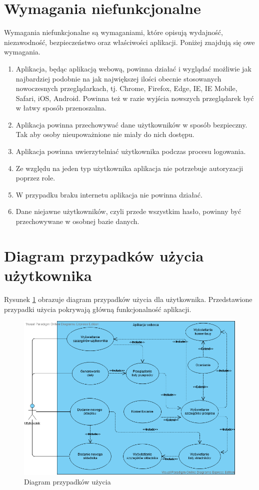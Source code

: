 \section{Wymagania niefunkcjonalne}
Wymagania niefunkcjonalne są wymaganiami, które opisują wydajność, niezawodność, bezpieczeństwo oraz właściwości aplikacji.\cite{analiza}
Poniżej znajdują się owe wymagania.
\begin{enumerate}
    \item Aplikacja, będąc aplikacją webową, powinna działać i wyglądać możliwie jak najbardziej podobnie na jak największej ilości obecnie stosowanych nowoczesnych przeglądarkach, tj. Chrome, Firefox, Edge, IE, IE Mobile, Safari, iOS, Android. Powinna też w razie wyjścia nowszych przeglądarek być w łatwy sposób przenoszalna.
    \item Aplikacja powinna przechowywać dane użytkowników w sposób bezpieczny. Tak aby osoby nieupoważnione nie miały do nich dostępu.
    \item Aplikacja powinna uwierzytelniać użytkownika podczas procesu logowania.
    \item Ze względu na jeden typ użytkownika aplikacja nie potrzebuje autoryzacji poprzez role.
    \item W przypadku braku internetu aplikacja nie powinna działać.
    \item Dane niejawne użytkowników, czyli przede wszystkim hasło, powinny być przechowywane w osobnej bazie danych.
\end{enumerate}
\section{Diagram przypadków użycia użytkownika}
Rysunek \ref{fig:use_case} obrazuje diagram przypadków użycia dla użytkownika. Przedstawione przypadki użycia pokrywają główną funkcjonalność aplikacji.

\begin{figure}[h]
\includegraphics[width=\textwidth]{rys/use-case.png}
\caption{Diagram przypadków użycia}
\label{fig:use_case}
\end{figure}

